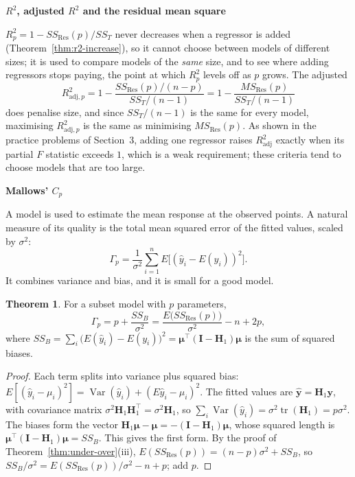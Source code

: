 \documentclass[11pt,a4paper]{article}
\numberwithin{equation}{section}
\theoremstyle{definition}
\newtheorem{thm}{Theorem}[subsection]
\newcommand{\subhead}[1]{%
  \par\medskip\noindent\textbf{#1}\par\nobreak\smallskip}
\begin{document}
\subhead{$R^2$, adjusted $R^2$ and the residual mean square}
$R^2_p = 1 - SS_{\mathrm{Res}}(p)/SS_T$ never decreases when a regressor is added
(Theorem~\ref{thm:r2-increase}), so it cannot choose between models of different sizes; it is
used to compare models of the \emph{same} size, and to see where adding regressors stops paying,
the point at which $R^2_p$ levels off as $p$ grows. The adjusted
\[
R^2_{\mathrm{adj},p} = 1 - \frac{SS_{\mathrm{Res}}(p)/(n - p)}{SS_T/(n - 1)} = 1 - \frac{MS_{\mathrm{Res}}(p)}{SS_T/(n - 1)}
\]
does penalise size, and since $SS_T/(n - 1)$ is the same for every model, maximising
$R^2_{\mathrm{adj},p}$ is the same as minimising $MS_{\mathrm{Res}}(p)$. As shown in the practice problems of
Section~3, adding one regressor raises $R^2_{\mathrm{adj}}$ exactly when its partial $F$ statistic exceeds
$1$, which is a weak requirement; these criteria tend to choose models that are too large.

\subhead{Mallows' $C_p$}
A model is used to estimate the mean response at the observed points. A natural measure of its
quality is the total mean squared error of the fitted values, scaled by $\sigma^2$:
\[
\Gamma_p = \frac{1}{\sigma^2}\sum_{i=1}^n E\bigl[(\hat y_i - E(y_i))^2\bigr] .
\]
It combines variance and bias, and it is small for a good model.

\begin{thm}\label{thm:cp}
For a subset model with $p$ parameters,
\[
\Gamma_p = p + \frac{SS_B}{\sigma^2} = \frac{E\bigl(SS_{\mathrm{Res}}(p)\bigr)}{\sigma^2} - n + 2p ,
\]
where $SS_B = \sum_i\bigl(E(\hat y_i) - E(y_i)\bigr)^2 = \boldsymbol\mu^\top(\mathbf{I} - \mathbf{H}_1)\boldsymbol\mu$ is the sum of
squared biases.
\end{thm}

\begin{proof}
Each term splits into variance plus squared bias:
$E[(\hat y_i - \mu_i)^2] = \operatorname{Var}(\hat y_i) + (E\hat y_i - \mu_i)^2$. The fitted values are
$\hat{\mathbf{y}} = \mathbf{H}_1\mathbf{y}$, with covariance matrix $\sigma^2\mathbf{H}_1\mathbf{H}_1^\top = \sigma^2\mathbf{H}_1$, so
$\sum_i\operatorname{Var}(\hat y_i) = \sigma^2\operatorname{tr}(\mathbf{H}_1) = p\sigma^2$. The biases form the vector
$\mathbf{H}_1\boldsymbol\mu - \boldsymbol\mu = -(\mathbf{I} - \mathbf{H}_1)\boldsymbol\mu$, whose squared length is
$\boldsymbol\mu^\top(\mathbf{I} - \mathbf{H}_1)\boldsymbol\mu = SS_B$. This gives the first form. By the proof of
Theorem~\ref{thm:under-over}(iii), $E(SS_{\mathrm{Res}}(p)) = (n - p)\sigma^2 + SS_B$, so
$SS_B/\sigma^2 = E(SS_{\mathrm{Res}}(p))/\sigma^2 - n + p$; add $p$.
\end{proof}
\end{document}
